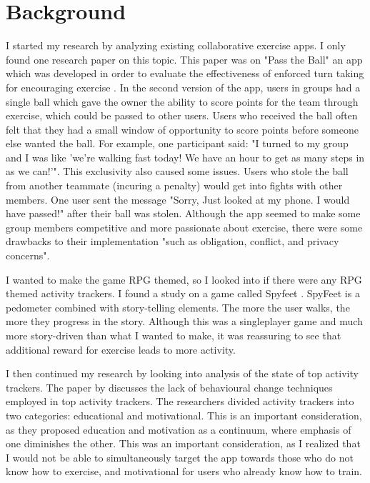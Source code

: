 \documentclass{l4proj}
\begin{document}
\chapter{Background}
 

% 
I started my research by analyzing existing collaborative exercise apps. I only found one research paper on this topic. This paper was on "Pass the Ball" an app which was developed in order to evaluate the effectiveness of enforced turn taking for encouraging exercise \citep{Pass_the_ball}. In the second version of the app, users in groups had a single ball which gave the owner the ability to score points for the team through exercise, which could be passed to other users. Users who received the ball often felt that they had a small window of opportunity to score points before someone else wanted the ball. For example, one participant said: "I turned to my group and I was like 'we’re walking fast today! We have an hour to get as many steps in as we can!'". This exclusivity also caused some issues. Users who stole the ball from another teammate (incuring a penalty) would get into fights with other members. One user sent the message "Sorry, Just looked at my phone. I would have passed!" after their ball was stolen. Although the app seemed to make some group members competitive and more passionate about exercise, there were some drawbacks to their implementation "such as obligation, conflict, and privacy concerns".

I wanted to make the game RPG themed, so I looked into if there were any RPG themed activity trackers. I found a study on a game called Spyfeet \citep{SpyFeet}. SpyFeet is a pedometer combined with story-telling elements. The more the user walks, the more they progress in the story. Although this was a singleplayer game and much more story-driven than what I wanted to make, it was reassuring to see that additional reward for exercise leads to more activity.

I then continued my research by looking into analysis of the state of top activity trackers. The paper by \citet{Behavior_change} discusses the lack of behavioural change techniques employed in top activity trackers. The researchers divided activity trackers into two categories: educational and motivational. This is an important consideration, as they proposed education and motivation as a continuum, where emphasis of one diminishes the other. This was an important consideration, as I realized that I would not be able to simultaneously target the app towards those who do not know how to exercise, and motivational for users who already know how to train.
\end{document}
